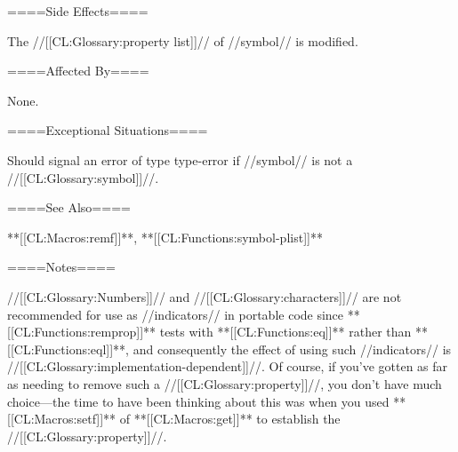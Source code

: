 ====Side Effects====

The //[[CL:Glossary:property list]]// of //symbol// is modified.

====Affected By====

None.

====Exceptional Situations====

Should signal an error of type type-error if //symbol// is not a //[[CL:Glossary:symbol]]//.

====See Also====

**[[CL:Macros:remf]]**, **[[CL:Functions:symbol-plist]]**

====Notes====

//[[CL:Glossary:Numbers]]// and //[[CL:Glossary:characters]]// are not recommended for use as //indicators// in portable code since **[[CL:Functions:remprop]]** tests with **[[CL:Functions:eq]]** rather than **[[CL:Functions:eql]]**, and consequently the effect of using such //indicators// is //[[CL:Glossary:implementation-dependent]]//. Of course, if you've gotten as far as needing to remove such a //[[CL:Glossary:property]]//, you don't have much choice---the time to have been thinking about this was when you used **[[CL:Macros:setf]]** of **[[CL:Macros:get]]** to establish the //[[CL:Glossary:property]]//.

 
